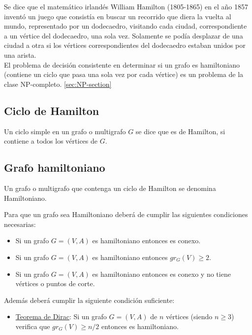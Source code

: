 Se dice que el matemático irlandés William Hamilton (1805-1865) en el año 1857 inventó un juego que consistía en buscar un recorrido que diera la vuelta al mundo, representado por un dodecaedro, visitando cada ciudad, correspondiente a un vértice del dodecaedro, una sola vez. Solamente se podía desplazar de una ciudad a otra si los vértices correspondientes del dodecaedro estaban unidos por una arista.\\

El problema de decisión consistente en determinar si un grafo es hamiltoniano (contiene un ciclo que pasa una sola vez por cada vértice) es un problema de la clase NP-completo. \ref{sec:NP-section}

\subsection{Ciclo de Hamilton}

\begin{fondo}
Un ciclo simple en un grafo o multigrafo $G$ se dice que es de Hamilton, si contiene a todos los vértices de $G$.
\end{fondo}

\subsection{Grafo hamiltoniano}

\begin{fondo}
Un grafo o multigrafo que contenga un ciclo de Hamilton se denomina Hamiltoniano.
\end{fondo}

Para que un grafo sea Hamiltoniano deberá de cumplir las siguientes condiciones necesarias:\\
\begin{itemize}
\item Si un grafo $G = (V,A)$ es hamiltoniano entonces es conexo.
\item Si un grafo $G = (V,A)$ es hamiltoniano entonces $gr_G(V) \geq 2$.
\item Si un grafo $G = (V,A)$ es hamiltoniano entonces es conexo y no tiene vértices o puntos de corte.
\end{itemize}

Además deberá cumplir la siguiente condición suficiente:\\
\begin{itemize}
\item \underline{Teorema de Dirac}: Si un grafo $G = (V,A)$ de $n$ vértices (siendo $n \geq 3$) verifica que $gr_G(V) \geq n/2$ entonces es hamiltoniano.
\end{itemize}

